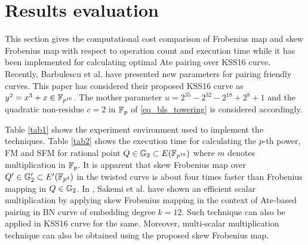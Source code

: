 \section{Results evaluation}
This section gives the computational cost comparison of Frobenius map and skew Frobenius map  with respect to operation count and execution time while it has been implemented for calculating optimal Ate pairing over KSS16 curve. Recently, Barbulescu et al. \cite{EPRINT:BarDuq17} have presented new parameters for pairing friendly curves. This paper has considered their proposed KSS16 curve as $y^2=x^3+x \in \mathbb{F}_{p^{16}}$. The mother parameter $ u=2^{35}-2^{32}-2^{18}+2^{8}+1$ and the quadratic non-residue  $c=2$ in $\mathbb{F}_p$ of \eqref{eq_bls_towering} is considered accordingly.

Table \ref{tab1} shows the experiment environment used to implement the techniques. Table \ref{tab2} shows the execution time for calculating the $p$-th power, FM and SFM for rational point $Q \in {\mathbb{G}}_{2} \subset E(\mathbb{F}_{p^{16}})$ where $m$ denotes multiplication in $\mathbb{F}_p$.  It is apparent that skew Frobenius map over $Q' \in {\mathbb{G}}_{2}' \subset E'(\mathbb{F}_{p^4})$ in the twisted curve is about four times faster than Frobenius mapping in  $Q \in {\mathbb{G}}_{2}$. In \cite{CANS:SNOKM08}, Sakemi et al. have shown an efficient scalar multiplication by applying skew Frobenius mapping in the context of Ate-based pairing in BN curve of embedding degree $k=12$. Such technique can also be applied in KSS16 curve for the same. Moreover, multi-scalar multiplication technique can also be obtained using the proposed skew Frobenius map.
\renewcommand{\baselinestretch}{1.5}
\begin{table}[!ht]
\centering
\caption{ Computational Environment}
\label{tab1}
\end{table}

